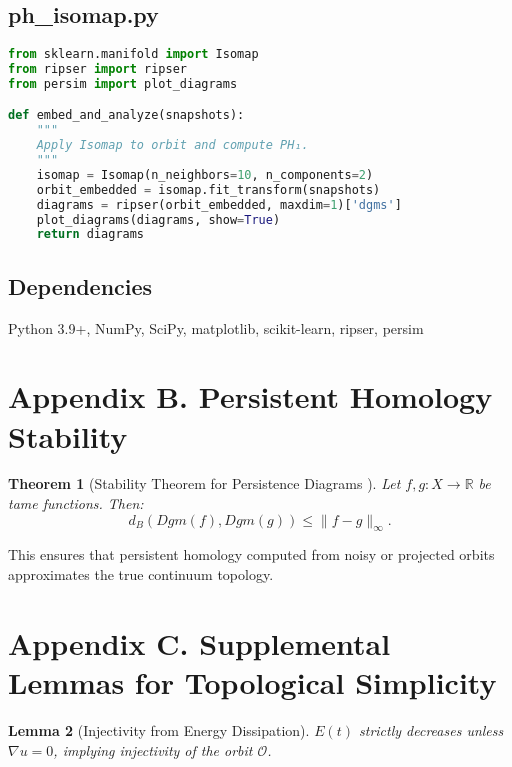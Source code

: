 \documentclass[11pt]{article}
\newtheorem{theorem}{Theorem}[section]
\newtheorem{lemma}[theorem]{Lemma}
\theoremstyle{definition}
\begin{document}
\subsection*{ph\_isomap.py}
\begin{lstlisting}[language=Python]
from sklearn.manifold import Isomap
from ripser import ripser
from persim import plot_diagrams

def embed_and_analyze(snapshots):
    """
    Apply Isomap to orbit and compute PH₁.
    """
    isomap = Isomap(n_neighbors=10, n_components=2)
    orbit_embedded = isomap.fit_transform(snapshots)
    diagrams = ripser(orbit_embedded, maxdim=1)['dgms']
    plot_diagrams(diagrams, show=True)
    return diagrams
\end{lstlisting}

\subsection*{Dependencies}
Python 3.9+, NumPy, SciPy, matplotlib, scikit-learn, ripser, persim


\section{Appendix B. Persistent Homology Stability}
\label{sec:appendixB}

\begin{theorem}[Stability Theorem for Persistence Diagrams \cite{CohenSteiner2007}]
Let $f, g : X \to \mathbb{R}$ be tame functions. Then:
\[
d_B(Dgm(f), Dgm(g)) \le \|f - g\|_\infty.
\]
\end{theorem}

This ensures that persistent homology computed from noisy or projected orbits approximates the true continuum topology.


\section{Appendix C. Supplemental Lemmas for Topological Simplicity}
\label{sec:appendixC}

\begin{lemma}[Injectivity from Energy Dissipation]
$E(t)$ strictly decreases unless $\nabla u = 0$, implying injectivity of the orbit $\mathcal{O}$.
\end{lemma}
\end{document}
